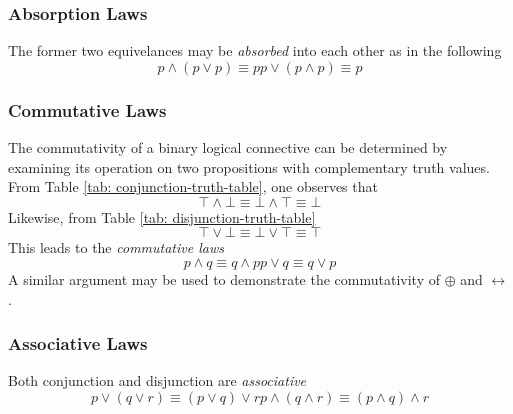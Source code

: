 \documentclass[twocolumn]{report}
\begin{document}
\subsubsection{Absorption Laws}
The former two equivelances may be \textit{absorbed} into each other as in the following 
\begin{subequations}
	\begin{equation}
		p \wedge (p \lor p) \equiv p
		\label{eqn: absorption-1}
	\end{equation}
	\begin{equation}
		p \lor (p \wedge p) \equiv p
		\label{eqn: absorption-2}
	\end{equation}
\end{subequations}
\subsubsection{Commutative Laws}
The commutativity of a binary logical connective can be determined by examining its operation on two propositions with complementary truth values. 
From Table \ref{tab: conjunction-truth-table}, one observes that
\[
	\top \wedge \bot \equiv \bot \wedge \top \equiv \bot
\]
Likewise, from Table \ref{tab: disjunction-truth-table}
\[
	\top \lor \bot \equiv \bot \lor \top \equiv \top
\]
This leads to the \textit{commutative laws}
\begin{subequations}
	\begin{equation}
		p \wedge q \equiv q \wedge p
		\label{eqn: conjunction-commutative-law}
	\end{equation}
	\begin{equation}
		p \lor q \equiv q \lor p
		\label{eqn: disjunction-commutative-law}
	\end{equation}
\end{subequations}
A similar argument may be used to demonstrate the commutativity of $\oplus$ and $\leftrightarrow$.
\subsubsection{Associative Laws}
Both conjunction and disjunction are \textit{associative}
\begin{subequations}
	\label{eqn: associative-laws}
	\begin{equation}
		p \lor (q \lor r) \equiv (p \lor q) \lor r
		\label{eqn: disjunction-associative-law}
	\end{equation}
	\begin{equation}
		p \wedge (q \wedge r) \equiv (p\wedge q) \wedge r
		\label{eqn: conjunction-associative-law}
	\end{equation}
\end{subequations}
\end{document}

